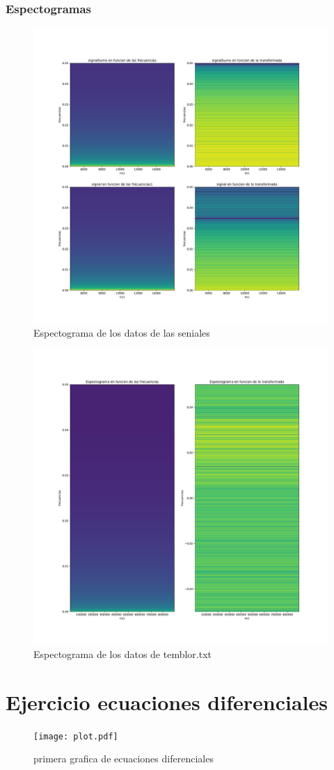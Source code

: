 \documentclass[11pt,letterpaper]{exam}
\begin{document}
\subsubsection{Espectogramas}
\begin{figure}[H]
    \centering
    \includegraphics[width=1.1\textwidth]{espectograma.pdf}
    \caption{Espectograma de los datos de las seniales}
    \label{fig:my_label}
\end{figure}
\begin{figure}[H]
    \centering
    \includegraphics[width=1.1\textwidth]{espectograma_temblor.pdf}
    \caption{Espectograma de los datos de temblor.txt}
    \label{fig:my_label}
\end{figure}
\section{Ejercicio ecuaciones diferenciales}
\begin{figure}[H]
    \centering
    \texttt{[image: plot.pdf]}
    \caption{primera grafica de ecuaciones diferenciales}
    \label{fig:my_label}
\end{figure}
\end{document}
